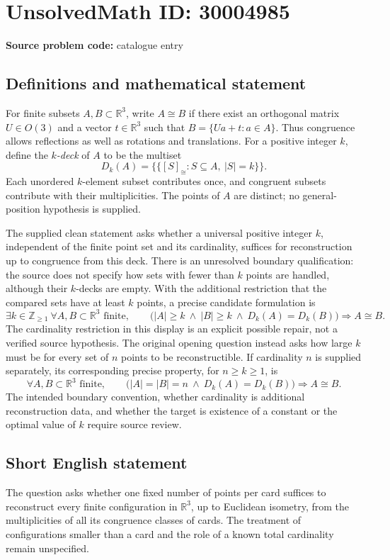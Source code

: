 \documentclass[11pt]{article}
\newcommand{\Z}{\mathbb{Z}}
\newcommand{\R}{\mathbb{R}}
\begin{document}
\section*{UnsolvedMath ID: 30004985}
\textbf{Source problem code:} catalogue entry
\subsection{Definitions and mathematical statement}
For finite subsets \(A,B\subset\R^3\), write \(A\cong B\) if there exist an orthogonal matrix \(U\in O(3)\) and a vector \(t\in\R^3\) such that \(B=\{Ua+t:a\in A\}\). Thus congruence allows reflections as well as rotations and translations. For a positive integer \(k\), define the \emph{\(k\)-deck} of \(A\) to be the multiset
\[
D_k(A)=\bigl\{\!\bigl\{[S]_{\cong}:S\subseteq A,\ |S|=k\bigr\}\!\bigr\}.
\]
Each unordered \(k\)-element subset contributes once, and congruent subsets contribute with their multiplicities. The points of \(A\) are distinct; no general-position hypothesis is supplied.

The supplied clean statement asks whether a universal positive integer \(k\), independent of the finite point set and its cardinality, suffices for reconstruction up to congruence from this deck. There is an unresolved boundary qualification: the source does not specify how sets with fewer than \(k\) points are handled, although their \(k\)-decks are empty. With the additional restriction that the compared sets have at least \(k\) points, a precise candidate formulation is
\[
\exists k\in\Z_{\ge1}\ \forall A,B\subset\R^3\text{ finite},\qquad
\bigl(|A|\ge k\ \land\ |B|\ge k\ \land\ D_k(A)=D_k(B)\bigr)
\Longrightarrow A\cong B.
\]
The cardinality restriction in this display is an explicit possible repair, not a verified source hypothesis. The original opening question instead asks how large \(k\) must be for every set of \(n\) points to be reconstructible. If cardinality \(n\) is supplied separately, its corresponding precise property, for \(n\ge k\ge1\), is
\[
\forall A,B\subset\R^3\text{ finite},\qquad
\bigl(|A|=|B|=n\ \land\ D_k(A)=D_k(B)\bigr)
\Longrightarrow A\cong B.
\]
The intended boundary convention, whether cardinality is additional reconstruction data, and whether the target is existence of a constant or the optimal value of \(k\) require source review.
\subsection{Short English statement}
The question asks whether one fixed number of points per card suffices to reconstruct every finite configuration in \(\R^3\), up to Euclidean isometry, from the multiplicities of all its congruence classes of cards. The treatment of configurations smaller than a card and the role of a known total cardinality remain unspecified.
\end{document}
